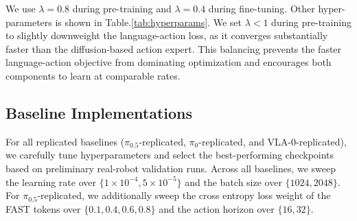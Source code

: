 We use $\lambda=0.8$ during pre-training and $\lambda=0.4$ during fine-tuning. Other hyper-parameters is shown in Table.\ref{tab:hyperparams}. We set $\lambda<1$ during pre-training to slightly downweight the language-action loss, as it converges substantially faster than the diffusion-based action expert. This balancing prevents the faster language-action objective from dominating optimization and encourages both components to learn at comparable rates.


\subsection{Baseline Implementations}
For all replicated baselines ($\pi_{0.5}$-replicated, $\pi_{0}$-replicated, and VLA-0-replicated), we carefully tune hyperparameters and select the best-performing checkpoints based on preliminary real-robot validation runs. 
Across all baselines, we sweep the learning rate over $\{1\times10^{-4}, 5\times10^{-5}\}$ and the batch size over $\{1024, 2048\}$. 
For $\pi_{0.5}$-replicated, we additionally sweep the cross entropy loss weight of the FAST tokens over $\{0.1, 0.4, 0.6, 0.8\}$ and the action horizon over $\{16, 32\}$.


